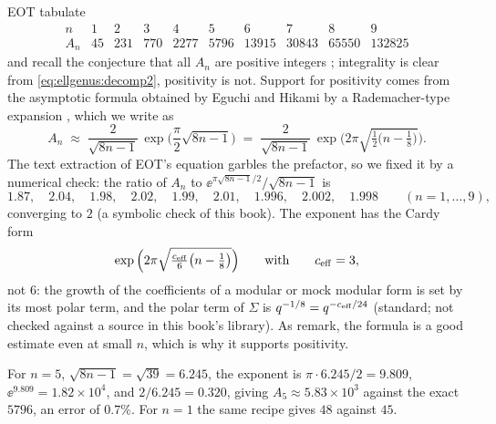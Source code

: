 EOT tabulate 
\begin{equation}\label{eq:ellgenus:An_table}
\begin{array}{c|ccccccccc}
 n   & 1 & 2 & 3 & 4 & 5 & 6 & 7 & 8 & 9\\ \hline
 A_n & 45 & 231 & 770 & 2277 & 5796 & 13915 & 30843 & 65550 & 132825
\end{array}
\end{equation}
and recall the conjecture that all $A_n$ are positive integers ;
integrality is clear from \eqref{eq:ellgenus:decomp2}, positivity is not. Support for
positivity comes from the asymptotic formula obtained by Eguchi and Hikami by a
Rademacher-type expansion , which we write as
\begin{equation}\label{eq:ellgenus:asymp}
 A_n\;\approx\;\frac{2}{\sqrt{8n-1}}\,\exp\!\Big(\frac{\pi}{2}\sqrt{8n-1}\Big)
 \;=\;\frac{2}{\sqrt{8n-1}}\,\exp\!\Big(2\pi\sqrt{\tfrac12\big(n-\tfrac18\big)}\Big).
\end{equation}
The text extraction of EOT's equation garbles the prefactor, so we fixed it by a numerical
check: the ratio of $A_n$ to $\ee^{\pi\sqrt{8n-1}/2}/\sqrt{8n-1}$ is
\begin{equation*}
 1.87,\quad 2.04,\quad 1.98,\quad 2.02,\quad 1.99,\quad 2.01,\quad 1.996,\quad 2.002,\quad 1.998
 \qquad(n=1,\dots,9),
\end{equation*}
converging to $2$ (a symbolic check of this book). The exponent has the Cardy form
\begin{equation*}
 \exp\Big(2\pi\sqrt{\tfrac{c_{\rm eff}}{6}\big(n-\tfrac18\big)}\Big)
 \qquad\text{with}\qquad c_{\rm eff}=3,
\end{equation*}
not $6$: the growth of the coefficients of a modular or mock modular form is set by its most
polar term, and the polar term of $\Sigma$ is $q^{-1/8}=q^{-c_{\rm eff}/24}$ (standard; not
checked against a source in this book's library). As  remark, the formula is a good estimate even at small
$n$, which is why it supports positivity.

\begin{example}
For $n=5$, $\sqrt{8n-1}=\sqrt{39}=6.245$, the exponent is $\pi\cdot6.245/2=9.809$,
$\ee^{9.809}=1.82\times10^4$, and $2/6.245=0.320$, giving $A_5\approx5.83\times10^3$ against
the exact $5796$, an error of $0.7\%$. For $n=1$ the same recipe gives $48$ against $45$.
\end{example}


